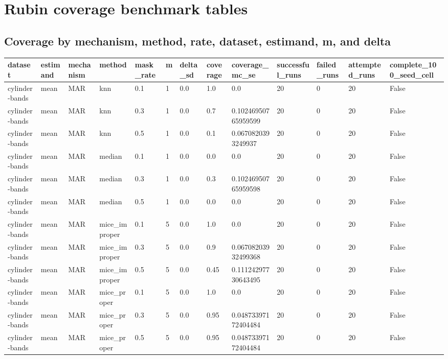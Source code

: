 
\section*{Rubin coverage benchmark tables}

\subsection*{Coverage by mechanism, method, rate, dataset, estimand, m, and delta}

\begin{tabular}{lllllllllllll}
\hline
dataset & estimand & mechanism & method & mask\_rate & m & delta\_sd & coverage & coverage\_mc\_se & successful\_runs & failed\_runs & attempted\_runs & complete\_100\_seed\_cell \\
\hline
cylinder-bands & mean & MAR & knn & 0.1 & 1 & 0.0 & 1.0 & 0.0 & 20 & 0 & 20 & False \\
cylinder-bands & mean & MAR & knn & 0.3 & 1 & 0.0 & 0.7 & 0.10246950765959599 & 20 & 0 & 20 & False \\
cylinder-bands & mean & MAR & knn & 0.5 & 1 & 0.0 & 0.1 & 0.0670820393249937 & 20 & 0 & 20 & False \\
cylinder-bands & mean & MAR & median & 0.1 & 1 & 0.0 & 0.0 & 0.0 & 20 & 0 & 20 & False \\
cylinder-bands & mean & MAR & median & 0.3 & 1 & 0.0 & 0.3 & 0.10246950765959598 & 20 & 0 & 20 & False \\
cylinder-bands & mean & MAR & median & 0.5 & 1 & 0.0 & 0.0 & 0.0 & 20 & 0 & 20 & False \\
cylinder-bands & mean & MAR & mice\_improper & 0.1 & 5 & 0.0 & 1.0 & 0.0 & 20 & 0 & 20 & False \\
cylinder-bands & mean & MAR & mice\_improper & 0.3 & 5 & 0.0 & 0.9 & 0.06708203932499368 & 20 & 0 & 20 & False \\
cylinder-bands & mean & MAR & mice\_improper & 0.5 & 5 & 0.0 & 0.45 & 0.11124297730643495 & 20 & 0 & 20 & False \\
cylinder-bands & mean & MAR & mice\_proper & 0.1 & 5 & 0.0 & 1.0 & 0.0 & 20 & 0 & 20 & False \\
cylinder-bands & mean & MAR & mice\_proper & 0.3 & 5 & 0.0 & 0.95 & 0.04873397172404484 & 20 & 0 & 20 & False \\
cylinder-bands & mean & MAR & mice\_proper & 0.5 & 5 & 0.0 & 0.95 & 0.04873397172404484 & 20 & 0 & 20 & False \\

\end{tabular}
